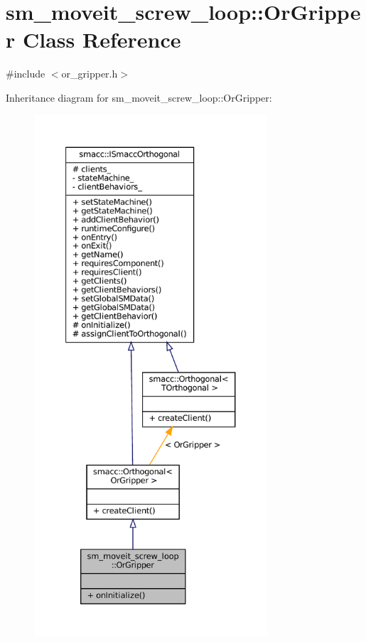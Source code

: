 \hypertarget{classsm__moveit__screw__loop_1_1OrGripper}{}\section{sm\+\_\+moveit\+\_\+screw\+\_\+loop\+:\+:Or\+Gripper Class Reference}
\label{classsm__moveit__screw__loop_1_1OrGripper}


{\ttfamily \#include $<$or\+\_\+gripper.\+h$>$}



Inheritance diagram for sm\+\_\+moveit\+\_\+screw\+\_\+loop\+:\+:Or\+Gripper\+:
\nopagebreak
\begin{figure}[H]
\begin{center}
\leavevmode
\includegraphics[height=550pt]{classsm__moveit__screw__loop_1_1OrGripper__inherit__graph}
\end{center}
\end{figure}


